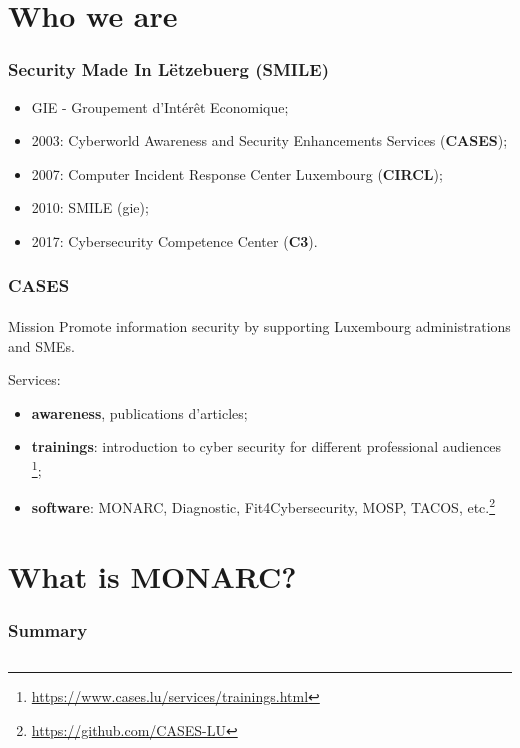%
%
\section{Who we are}
\begin{frame}
    \frametitle{Security Made In Lëtzebuerg (SMILE)}
    \begin{center}
        \begin{itemize}
            \item GIE - Groupement d’Intérêt Economique;
            \item 2003: Cyberworld Awareness and Security Enhancements Services (\textbf{CASES});
            \item 2007: Computer Incident Response Center Luxembourg (\textbf{CIRCL});
            \item 2010: SMILE (gie);
            \item 2017: Cybersecurity Competence Center (\textbf{C3}).
        \end{itemize}
    \end{center}
\end{frame}

\begin{frame}
    \frametitle{CASES}
    \framesubtitle{}
    \begin{block}{Mission}
        Promote information security by supporting Luxembourg administrations and SMEs.
    \end{block}
    Services:
    \begin{center}
        \begin{itemize}
            \item \textbf{awareness}, publications d'articles;
            \item \textbf{trainings}:
                introduction to cyber security for different professional audiences \footnote{\url{https://www.cases.lu/services/trainings.html}};
            \item \textbf{software}:
                MONARC, Diagnostic, Fit4Cybersecurity, MOSP, TACOS, etc.\footnote{\url{https://github.com/CASES-LU}}
        \end{itemize}
    \end{center}
\end{frame} 




% 
%
\section{What is MONARC?}
\begin{frame}
    \frametitle{Summary}
    \begin{columns}[t]
        \begin{column}{5cm}
            \tableofcontents[sections={1-3}, currentsection, hideothersubsections]
        \end{column}
        \begin{column}{5cm}
            \tableofcontents[sections={4-5}, currentsection, hideothersubsections]
        \end{column}
    \end{columns}
\end{frame}
